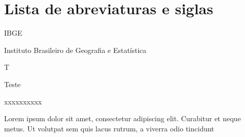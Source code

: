 \newcommand\siglaTamanho{10ex} %
\newcommand\siglaGap{1ex} %
\newcommand\significadoSiglaTamanho{\dimexpr\linewidth-\siglaTamanho-\siglaGap\relax}
\newcommand\sigla[2]{\noindent\parbox[t]{\siglaTamanho}{#1\strut}%
  \hspace{\siglaGap}%
  \parbox[t]{\significadoSiglaTamanho}{#2\strut}}

\chapter*{Lista de abreviaturas e siglas}

\sigla{IBGE}{Instituto Brasileiro de Geografia e Estatística}

\sigla{T}{Teste}

\sigla{xxxxxxxxxx}{Lorem ipsum dolor sit amet, consectetur adipiscing elit. Curabitur et neque metus. Ut volutpat sem quis lacus rutrum, a viverra odio tincidunt}